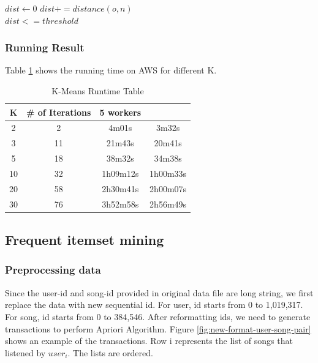 \documentclass[11pt]{article} %
\begin{document}
\begin{algorithmic}[1]
\State $dist \gets 0$
	\State $dist += distance(o, n)$
\EndFor \\
\Return $dist <= threshold$
\EndFunction
\end{algorithmic}

\subsubsection{Running Result}
Table \ref{table: kmean-running-time-table} shows the running time on AWS for different K.

\begin{table}[htdp]
\caption{K-Means Runtime Table}
\begin{center}
\begin{tabular}{|c|c|c|c|}
\hline
K & \# of Iterations & 5 workers \\ \hline
2 & 2 &	4m01s & 3m32s \\ \hline
3 & 11 &	21m43s & 20m41s\\ \hline
5 &	18 & 38m32s & 34m38s\\ \hline
10 & 32 & 1h09m12s & 1h00m33s	\\ \hline
20 & 58 & 2h30m41s & 2h00m07s	\\ \hline
30 & 76 & 3h52m58s & 2h56m49s	\\ \hline
\end{tabular}
\end{center}
\label{table: kmean-running-time-table}
\end{table}%

\subsection{Frequent itemset mining}
\subsubsection{Preprocessing data}

Since the user-id and song-id provided in original data file are long string, we first replace the data with new sequential id. For user, id starts from 0 to 1,019,317. For song, id starts from 0 to 384,546. After reformatting ids, we need to generate transactions to perform Apriori Algorithm. Figure \ref{fig:new-format-user-song-pair} shows an example of the transactions. Row i represents the list of songs that listened by $user_{i}$. The lists are ordered.
\end{document}
